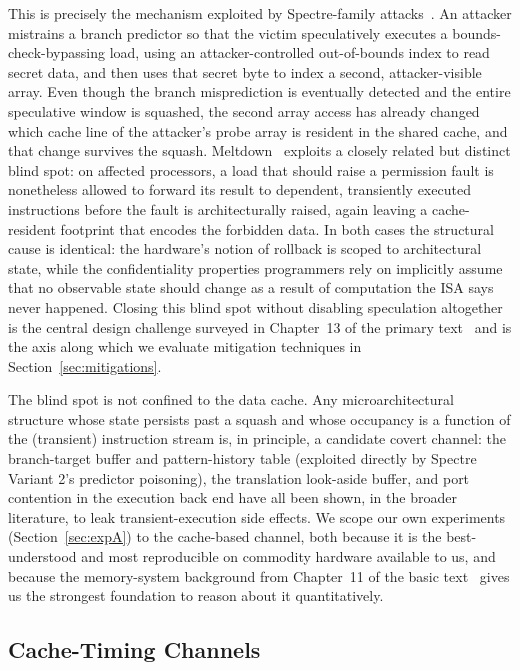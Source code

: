 \documentclass[11pt,a4paper]{article}
\begin{document}
This is precisely the mechanism exploited by Spectre-family
attacks~\cite{kocher2019spectre}. An attacker mistrains a branch predictor so
that the victim speculatively executes a bounds-check-bypassing load, using an
attacker-controlled out-of-bounds index to read secret data, and then uses that
secret byte to index a second, attacker-visible array. Even though the branch
misprediction is eventually detected and the entire speculative window is
squashed, the second array access has already changed which cache line of the
attacker's probe array is resident in the shared cache, and that change
survives the squash. Meltdown~\cite{lipp2018meltdown} exploits a closely
related but distinct blind spot: on affected processors, a load that should
raise a permission fault is nonetheless allowed to forward its result to
dependent, transiently executed instructions before the fault is
architecturally raised, again leaving a cache-resident footprint that encodes
the forbidden data. In both cases the structural cause is identical: the
hardware's notion of rollback is scoped to architectural state, while the
confidentiality properties programmers rely on implicitly assume that no
observable state should change as a result of computation the ISA says never
happened. Closing this blind spot without disabling speculation altogether is
the central design challenge surveyed in Chapter~13 of the primary
text~\cite{sarangi2023nextgen} and is the axis along which we evaluate
mitigation techniques in Section~\ref{sec:mitigations}.

The blind spot is not confined to the data cache. Any microarchitectural
structure whose state persists past a squash and whose occupancy is a function
of the (transient) instruction stream is, in principle, a candidate covert
channel: the branch-target buffer and pattern-history table (exploited directly
by Spectre Variant 2's predictor poisoning), the translation look-aside buffer,
and port contention in the execution back end have all been shown, in the
broader literature, to leak transient-execution side effects. We scope our own
experiments (Section~\ref{sec:expA}) to the cache-based channel, both because
it is the best-understood and most reproducible on commodity hardware available
to us, and because the memory-system background from Chapter~11 of the basic
text~\cite{sarangi2025basic} gives us the strongest foundation to reason about
it quantitatively.

\subsection{Cache-Timing Channels}
\label{sec:cachetiming}
\end{document}
